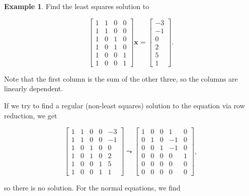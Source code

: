 \documentclass[
]{book}
\theoremstyle{definition}
\theoremstyle{definition}
\newtheorem{example}{Example}[chapter]
\theoremstyle{definition}
\theoremstyle{definition}
\theoremstyle{remark}
\begin{document}
\begin{examplebox}

\begin{example}
\protect\hypertarget{exm:ims}{}\label{exm:ims}Find the least squares solution to

\[\begin{bmatrix}1 & 1 & 0 & 0\\1 & 1 & 0 & 0\\1 & 0 & 1 & 0\\1 & 0 & 1 & 0\\1 & 0 & 0 & 1\\1 & 0 & 0 & 1\end{bmatrix}\mathbf{x}=\begin{bmatrix}-3\\-1\\0\\2\\5\\1\end{bmatrix}.\]

Note that the first column is the sum of the other three, so the columns are linearly dependent.

If we try to find a regular (non-least squares) solution to the equation via row reduction, we get

\[\left[\begin{array}{cccc|r} 1 & 1 & 0 & 0 & -3\\1 & 1 & 0 & 0 & -1\\1 & 0 & 1 & 0 & 0\\ 1 & 0 & 1 & 0 & 2\\1 & 0 & 0 & 1 & 5\\1 & 0 & 0 & 1 & 1\end{array}\right]\leadsto \left[\begin{array}{cccr|r} 1 & 0 & 0 & 1 & 0\\0 & 1 & 0 & -1 & 0\\0 & 0 & 1 & -1 & 0\\0 & 0 & 0 & 0 & 1\\0 & 0 & 0 & 0 & 0 \\0 & 0 & 0 & 0 & 0\end{array}\right],\]

so there is no solution. For the normal equations, we find


\end{example}
\end{examplebox}
\end{document}
